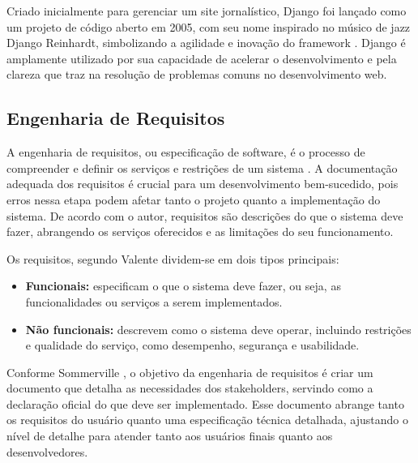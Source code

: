 Criado inicialmente para gerenciar um site jornalístico, Django foi lançado como um projeto de código aberto em 2005, com seu nome inspirado no músico de jazz Django Reinhardt, simbolizando a agilidade e inovação do framework \cite{meireles2010}. Django é amplamente utilizado por sua capacidade de acelerar o desenvolvimento e pela clareza que traz na resolução de problemas comuns no desenvolvimento web.

\subsection{Engenharia de Requisitos}
A engenharia de requisitos, ou especificação de software, é o processo de compreender e definir os serviços e restrições de um sistema \cite{sommerville2011}. A documentação adequada dos requisitos é crucial para um desenvolvimento bem-sucedido, pois erros nessa etapa podem afetar tanto o projeto quanto a implementação do sistema. De acordo com o autor, requisitos são descrições do que o sistema deve fazer, abrangendo os serviços oferecidos e as limitações do seu funcionamento.

Os requisitos, segundo Valente \cite{valente2020} dividem-se em dois tipos principais:

\begin{itemize}
    \item \textbf{Funcionais:} especificam o que o sistema deve fazer, ou seja, as funcionalidades ou serviços a serem implementados.
    \item \textbf{Não funcionais:} descrevem como o sistema deve operar, incluindo restrições e qualidade do serviço, como desempenho, segurança e usabilidade.
\end{itemize}

Conforme Sommerville \cite{sommerville2011}, o objetivo da engenharia de requisitos é criar um documento que detalha as necessidades dos stakeholders, servindo como a declaração oficial do que deve ser implementado. Esse documento abrange tanto os requisitos do usuário quanto uma especificação técnica detalhada, ajustando o nível de detalhe para atender tanto aos usuários finais quanto aos desenvolvedores.

